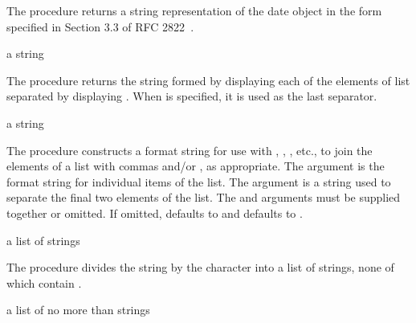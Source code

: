 The  procedure returns a string representation of
the date object  in the form specified in Section 3.3 of RFC
2822~\cite{RFC2822}.

\begin{procedure}
\end{procedure}
\returns{} a string

The  procedure returns the string formed by displaying each
of the elements of list  separated by displaying
. When  is specified, it is used as
the last separator.

\begin{procedure}
\end{procedure}
\returns{} a string

The  procedure constructs a format string for use with
, , , etc., to join the elements
of a list with commas and/or , as appropriate.
The  argument is the format string for individual
items of the list.
The  argument is a string used to separate the final two elements
of the list.
The  and  arguments must be supplied together or
omitted.
If omitted,  defaults to  and 
defaults to .

\begin{procedure}
\end{procedure}
\returns{} a list of strings

The  procedure divides the  string by the
 character into a list of strings, none of which
contain .

\begin{procedure}
\end{procedure}
\returns{} a list of no more than  strings

